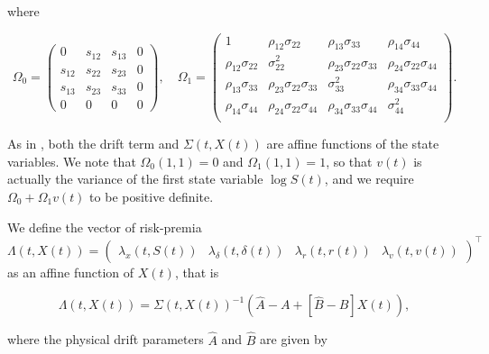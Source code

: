 \documentclass{article}
\begin{document}
\noindent where

\begin{equation*}
    {\Omega}_0 = \begin{pmatrix}
        0 & s_{12} & s_{13} & 0 \\
    s_{12} & s_{22} & s_{23} & 0  \\
    s_{13} & s_{23} & s_{33} & 0  \\
    0 & 0 & 0 & 0
    \end{pmatrix},\quad 
    {\Omega}_1  =  \begin{pmatrix}
    1 & \rho_{12} \sigma_{22} & \rho_{13} \sigma_{33} & \rho_{14} \sigma_{44} \\
    \rho_{12} \sigma_{22} & \sigma^2_{22} &\rho_{23} \sigma_{22} \sigma_{33} & \rho_{24} \sigma_{22} \sigma_{44} \\
    \rho_{13} \sigma_{33} & \rho_{23} \sigma_{22} \sigma_{33} & \sigma^2_{33} & \rho_{34} \sigma_{33} \sigma_{44} \\
    \rho_{14} \sigma_{44}& \rho_{24} \sigma_{22} \sigma_{44} & \rho_{34} \sigma_{33} \sigma_{44} & \sigma^2_{44}  \\
\end{pmatrix}.
\end{equation*}

As in \cite{duffie96}, both the drift term and \(\Sigma(t, {X}(t))\) are affine functions of the state variables. We note that \(\Omega_0(1,1)=0\) and \(\Omega_1(1,1)=1\), so that \(v(t)\) is actually the variance of the first state variable \(\log S(t)\), and we require \(\Omega_0 + \Omega_1 v(t)\) to be positive definite. 




We define the vector of risk-premia \(\Lambda (t,X(t)) = \begin{pmatrix}
    \lambda_x(t,S(t)) & \lambda_\delta(t,\delta(t)) & \lambda_r(t,r(t)) & \lambda_v(t,v(t))
\end{pmatrix}^\top \) as an affine function of ${X}(t)$, that is


\begin{equation}
    {\Lambda} (t,X(t)) = {\Sigma}(t,X(t))^{-1} \left( {\widehat{A}} - {A} + [{\widehat{B}} - {B}] X(t) \right), 
\end{equation}

\noindent where the physical drift parameters ${\widehat{A}}$ and ${\widehat{B}}$ are given by
\end{document}

